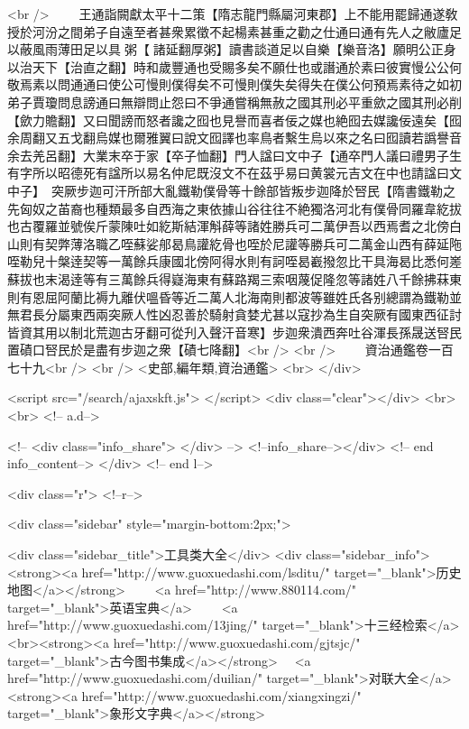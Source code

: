 <br />
　　王通詣闕獻太平十二策【隋志龍門縣屬河東郡】上不能用罷歸通遂敎授於河汾之間弟子自遠至者甚衆累徵不起楊素甚重之勸之仕通曰通有先人之敝廬足以蔽風雨薄田足以具粥【諸延翻厚粥】讀書談道足以自樂【樂音洛】願明公正身以治天下【治直之翻】時和歲豐通也受賜多矣不願仕也或譖通於素曰彼實慢公公何敬焉素以問通通曰使公可慢則僕得矣不可慢則僕失矣得失在僕公何預焉素待之如初弟子賈瓊問息謗通曰無辯問止怨曰不爭通嘗稱無赦之國其刑必平重歛之國其刑必削【歛力贍翻】又曰聞謗而怒者讒之囮也見譽而喜者佞之媒也絶囮去媒讒佞遠矣【囮余周翻又五戈翻烏媒也爾雅翼曰說文囮譯也率鳥者繫生烏以來之名曰囮讀若譌譽音余去羌呂翻】大業末卒于家【卒子恤翻】門人諡曰文中子【通卒門人議曰禮男子生有字所以昭德死有諡所以易名仲尼既沒文不在茲乎易曰黄裳元吉文在中也請諡曰文中子】　突厥步迦可汗所部大亂鐵勒僕骨等十餘部皆叛步迦降於唘民【隋書鐵勒之先匈奴之苖裔也種類最多自西海之東依據山谷往往不絶獨洛河北有僕骨同羅韋紇拔也古覆羅並號俟斤蒙陳吐如紇斯結渾斛薛等諸姓勝兵可二萬伊吾以西焉耆之北傍白山則有契弊薄洛職乙咥蘇娑郍曷鳥讙紇骨也咥於尼讙等勝兵可二萬金山西有薛延陁咥勒兒十槃逹契等一萬餘兵康國北傍阿得水則有訶咥曷嶻撥忽比干具海曷比悉何嵳蘇拔也末渴逹等有三萬餘兵得嶷海東有蘇路羯三索咽蔑促隆忽等諸姓八千餘拂菻東則有恩屈阿蘭比褥九離伏嗢昏等近二萬人北海南則都波等雖姓氏各别總謂為鐵勒並無君長分屬東西兩突厥人性凶忍善於騎射貪婪尤甚以寇抄為生自突厥有國東西征討皆資其用以制北荒迦古牙翻可從刋入聲汗音寒】步迦衆潰西奔吐谷渾長孫晟送唘民置磧口唘民於是盡有步迦之衆【磧七降翻】<br />
<br />
　　資治通鑑卷一百七十九<br />
<br />
<史部,編年類,資治通鑑>  <br>
   </div> 

<script src="/search/ajaxskft.js"> </script>
 <div class="clear"></div>
<br>
<br>
 <!-- a.d-->

 <!--
<div class="info_share">
</div> 
-->
 <!--info_share--></div>   <!-- end info_content-->
  </div> <!-- end l-->

<div class="r">   <!--r-->



<div class="sidebar"  style="margin-bottom:2px;">

 
<div class="sidebar_title">工具类大全</div>
<div class="sidebar_info">
<strong><a href="http://www.guoxuedashi.com/lsditu/" target="_blank">历史地图</a></strong>　　
<a href="http://www.880114.com/" target="_blank">英语宝典</a>　　
<a href="http://www.guoxuedashi.com/13jing/" target="_blank">十三经检索</a>　
<br><strong><a href="http://www.guoxuedashi.com/gjtsjc/" target="_blank">古今图书集成</a></strong>　
<a href="http://www.guoxuedashi.com/duilian/" target="_blank">对联大全</a>　<strong><a href="http://www.guoxuedashi.com/xiangxingzi/" target="_blank">象形文字典</a></strong>　

